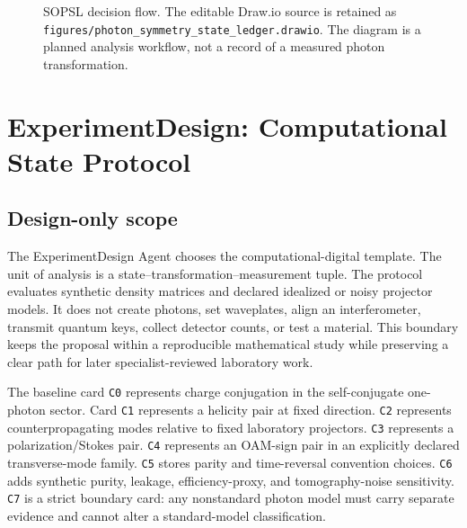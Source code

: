 \documentclass[conference]{../../../../Conference-LaTeX-template_10-17-19/IEEEtran}
\begin{document}
\begin{figure}[!t]
\centering
{}
\caption{SOPSL decision flow. The editable Draw.io source is retained as \texttt{figures/photon\_symmetry\_state\_ledger.drawio}. The diagram is a planned analysis workflow, not a record of a measured photon transformation.}
\label{fig:sopsl}
\end{figure}

\section{ExperimentDesign: Computational State Protocol}
\subsection{Design-only scope}
The ExperimentDesign Agent chooses the computational-digital template. The unit of analysis is a state--transformation--measurement tuple. The protocol evaluates synthetic density matrices and declared idealized or noisy projector models. It does not create photons, set waveplates, align an interferometer, transmit quantum keys, collect detector counts, or test a material. This boundary keeps the proposal within a reproducible mathematical study while preserving a clear path for later specialist-reviewed laboratory work.

The baseline card \texttt{C0} represents charge conjugation in the self-conjugate one-photon sector. Card \texttt{C1} represents a helicity pair at fixed direction. \texttt{C2} represents counterpropagating modes relative to fixed laboratory projectors. \texttt{C3} represents a polarization/Stokes pair. \texttt{C4} represents an OAM-sign pair in an explicitly declared transverse-mode family. \texttt{C5} stores parity and time-reversal convention choices. \texttt{C6} adds synthetic purity, leakage, efficiency-proxy, and tomography-noise sensitivity. \texttt{C7} is a strict boundary card: any nonstandard photon model must carry separate evidence and cannot alter a standard-model classification.
\end{document}
